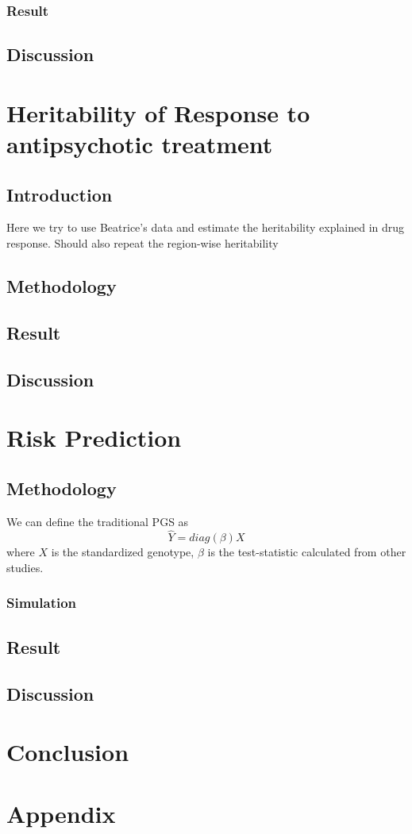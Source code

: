 \documentclass{book}
\begin{document}
	\subsection{Result}
	\section{Discussion}
	\chapter{Heritability of Response to antipsychotic treatment}
	\section{Introduction}
	Here we try to use Beatrice's data and estimate the heritability explained in drug response.
	Should also repeat the region-wise heritability
	\section{Methodology}
	\section{Result}
	\section{Discussion}
	\chapter{Risk Prediction}
	\section{Methodology}
	We can define the traditional \gls{PGS} as
	\begin{equation}
	\hat{Y} = diag(\beta)X
	\end{equation}
	where $X$ is the standardized genotype, $\beta$ is the test-statistic calculated from other studies. 
	
	
	\subsection{Simulation}
	\section{Result}
	\section{Discussion}
	\chapter{Conclusion}
	\backmatter
	\printbibliography
	\chapter*{Appendix}
\end{document}

